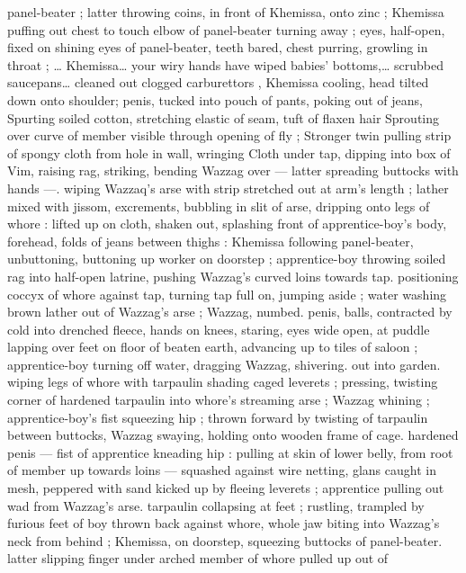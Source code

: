 panel-beater ; latter throwing coins, in front of Khemissa, onto zinc ; 
Khemissa puffing out chest to touch elbow of panel-beater turning 
away ; eyes, half-open, fixed on shining eyes of panel-beater, teeth 
bared, chest purring, growling in throat ; {\ldots}{\gl} Khemissa{\ldots} your wiry 
hands have wiped babies' bottoms,{\ldots} scrubbed saucepans{\ldots} cleaned 
out clogged carburettors{\td} {\gr}, Khemissa cooling, head tilted down onto 
shoulder; penis, tucked into pouch of pants, poking out of jeans, 
Spurting soiled cotton, stretching elastic of seam, tuft of flaxen hair 
Sprouting over curve of member visible through opening of fly ; 
Stronger twin pulling strip of spongy cloth from hole in wall, wringing 
Cloth under tap, dipping into box of Vim, raising rag, striking, 
bending Wazzag over --- latter spreading buttocks with hands ---. 
wiping Wazzaq's arse with strip stretched out at arm's length ; lather 
mixed with jissom, excrements, bubbling in slit of arse, dripping onto 
legs of whore : lifted up on cloth, shaken out, splashing front of 
apprentice-boy's body, forehead, folds of jeans between thighs : 
Khemissa following panel-beater, unbuttoning, buttoning up worker 
on doorstep ; apprentice-boy throwing soiled rag into half-open 
latrine, pushing Wazzag's curved loins towards tap. positioning 
coccyx of whore against tap, turning tap full on, jumping aside ; 
water washing brown lather out of Wazzag's arse ; Wazzag, numbed. 
penis, balls, contracted by cold into drenched fleece, hands on 
knees, staring, eyes wide open, at puddle lapping over feet on floor 
of beaten earth, advancing up to tiles of saloon ; apprentice-boy 
turning off water, dragging Wazzag, shivering. out into garden. 
wiping legs of whore with tarpaulin shading caged leverets ; 
pressing, twisting corner of hardened tarpaulin into whore's 
streaming arse ; Wazzag whining ; apprentice-boy's fist squeezing 
hip ; thrown forward by twisting of tarpaulin between buttocks, 
Wazzag swaying, holding onto wooden frame of cage. hardened 
penis --- fist of apprentice kneading hip : pulling at skin of lower 
belly, from root of member up towards loins --- squashed against 
wire netting, glans caught in mesh, peppered with sand kicked up by 
fleeing leverets ; apprentice pulling out wad from Wazzag's arse. 
tarpaulin collapsing at feet ; rustling, trampled by furious feet of boy 
thrown back against whore, whole jaw biting into Wazzag's neck from 
behind ; Khemissa, on doorstep, squeezing buttocks of panel-beater. 
latter slipping finger under arched member of whore pulled up out of 
